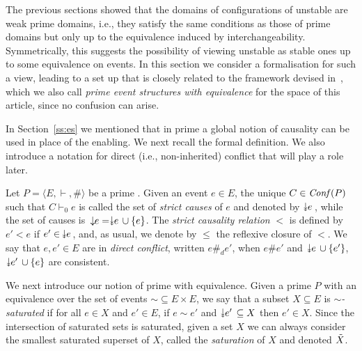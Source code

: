 The previous sections showed that the domains of configurations of
unstable {\esabbr} are weak prime domains, i.e., they satisfy the same
conditions as those of prime domains but only up to the equivalence
induced by interchangeability.
%
Symmetrically, this suggests the possibility of viewing unstable
{\esabbr} as stable ones up to some equivalence on events.
%
In this section we consider a formalisation for such a view,
leading to a set up that is closely related to the framework devised
in~\cite{win2017,VismeW19},
which we also call \emph{prime event structures with equivalence}
for the space of this article, since no confusion can arise.

In Section~\ref{ss:es} we mentioned that in prime {\esabbr} a global
notion of causality can be used in place of the enabling. We next
recall the formal definition. We also introduce a notation for direct
(i.e., non-inherited) conflict that will play a role later.

\begin{definition}
  Let $P = \langle E, \vdash, \# \rangle$ be a prime {\esabbr}.  Given
  an event $e \in E$, the unique $C \in \mathit{Conf}({P})$ such that
  $C \vdash_0 e$ is called the set of \emph{strict causes} of $e$ and
  denoted by $\scauses{e}$, while the set of causes is
  $\causes{e} = \scauses{e} \cup \{e\}$. The \emph{strict causality
    relation} $<$ is defined by $e' < e$ if $e' \in\, \scauses{e}$,
  and, as usual, we denote by $\leq$ the reflexive closure of $<$. We
  say that $e, e' \in E$ are in \emph{direct conflict}, written
  $e \#_d e'$, when $e \# e'$ and $\scauses{e} \cup \{e'\}$,
  $\scauses{e'} \cup \{e\}$ are consistent.
\end{definition}

We next introduce our notion of prime {\esabbr} with
equivalence. Given a prime {\esabbr} $P$ with an equivalence over the
set of events ${\sim}\subseteq E \times E$, we say that a subset
$X \subseteq E$ is \emph{$\sim$-saturated} if for all $e \in X$ and
$e' \in E$, if $e \sim e'$ and $\scauses{e'} \subseteq X$  then
$e' \in X$. Since the intersection of saturated sets is saturated, given a set $X$ we can always consider the smallest saturated superset of $X$, called the  \emph{saturation} of $X$ and denoted $\tilde{X}$.


